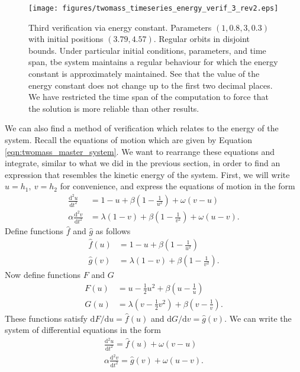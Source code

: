 \begin{figure}[h!]
    \centering
    \texttt{[image: figures/twomass\_timeseries\_energy\_verif\_3\_rev2.eps]}
    \caption{
        Third verification via energy constant.
        Parameters \((1, 0.8, 3, 0.3)\) with initial positions \((3.79, 4.57)\).
        Regular orbits in disjoint bounds.
        Under particular initial conditions, parameters, and time span,
        tbe system maintains a regular behaviour for which the energy constant is approximately maintained.
        See that the value of the energy constant does not change up to the first two decimal places.
        We have restricted the time span of the computation to force that the solution is more reliable than other results.
    }
    \label{fig:twomass_energy_3}
\end{figure}
We can also find a method of verification which relates to the energy of the system.
Recall the equations of motion which are given by Equation \ref{eqn:twomass_master_system}.
We want to rearrange these equations and integrate, similar to what we did in the previous section, in order to find an expression that resembles the kinetic energy of the system.
First, we will write \(u = h_1,~v=h_2\) for convenience, and express the equations of motion in the form
\begin{align*}
    \frac{\mathrm{d}^2 u}{\mathrm{d}t^2} &= 1 - u + \beta\left(1-\frac{1}{u^2}\right) + \omega(v-u) \\
    \alpha\frac{\mathrm{d}^2 v}{\mathrm{d}t^2} &= \lambda(1 - v) + \beta\left(1-\frac{1}{v^2}\right) + \omega(u-v).
\end{align*}
Define functions $\hat{f}$ and $\hat{g}$ as follows
\begin{align*}
    \hat{f}(u) &= 1-u + \beta\left(1-\frac{1}{u^2}\right) \\
    \hat{g}(v) &= \lambda(1-v) + \beta\left( 1-\frac{1}{v^2} \right).
\end{align*}
Now define functions $F$ and $G$
\begin{align*}
    F(u) &= u - \frac{1}{2}u^2 + \beta\left(u - \frac{1}{u} \right) \\
    G(u) &= \lambda\left( v - \frac{1}{2}v^2 \right) + \beta\left( v - \frac{1}{v}\right).
\end{align*}
These functions satisfy \(\mathrm{d}F/\mathrm{d}u = \hat{f}(u)\) and \(\mathrm{d}G/\mathrm{d}v = \hat{g}(v)\).
We can write the system of differential equations in the form
\begin{align*}
    \frac{\mathrm{d}^2 u}{\mathrm{d}t^2} = \hat{f}(u) + \omega(v-u) \\
    \alpha\frac{\mathrm{d}^2 v}{\mathrm{d}t^2} = \hat{g}(v) + \omega(u-v).
\end{align*}
